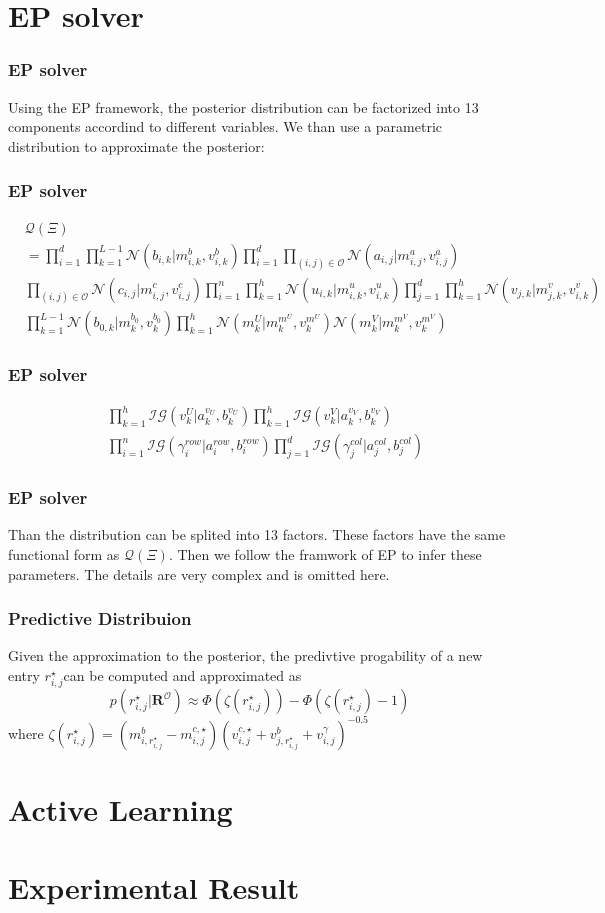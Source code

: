 \documentclass{beamer}
\newcommand{\vect}[1]{\boldsymbol{\mathbf{#1}}} %
\newcommand{\vR}{\vect{R}}
\newcommand{\mN}{\mathcal{N}}
\newcommand{\mO}{\mathcal{O}}
\newcommand{\mQ}{\mathcal{Q}}
\begin{document}
\section{EP solver}
\begin{frame}
    \frametitle{EP solver}
    Using the EP framework, the posterior distribution can be factorized into 13 components accordind to different variables.  We than use a parametric distribution to approximate the posterior:
\end{frame}
\begin{frame}
    \frametitle{EP solver}
    \begin{equation*}
	\begin{split}
	&\mQ(\Xi) \\
	&= \prod_{i=1}^d \prod_{k=1}^{L-1} \mN(b_{i,k}|m_{i,k}^b, v_{i,k}^b)\prod_{i=1}^d \prod_{(i,j)\in \mO} \mN(a_{i,j}|m_{i,j}^a, v_{i,j}^a)\\
	&\prod_{(i,j)\in \mO} \mN(c_{i,j}|m_{i,j}^c, v_{i,j}^c)  \prod_{i=1}^n \prod_{k=1}^{h} \mN(u_{i,k}|m_{i,k}^u, v_{i,k}^u) \prod_{j=1}^d \prod_{k=1}^{h} \mN(v_{j,k}|m_{j,k}^v, v_{i,k}^v)\\
	&\prod^{L-1}_{k=1}\mN(b_{0,k}|m_k^{b_0}, v_k^{b_0})\prod^{h}_{k=1}\mN(m_k^{U}|m_k^{m^U}, v_k^{m^U})\mN(m_k^{V}|m_k^{m^V}, v_k^{m^V})
	\end{split}
    \end{equation*}
\end{frame}
\begin{frame}
    \frametitle{EP solver}
    \begin{equation*}
	\begin{split}
	    & \prod_{k=1}^h \mathcal{IG}(v_k^U|a_k^{v_U}, b_k^{v_U})\prod_{k=1}^h \mathcal{IG}(v_k^V|a_k^{v_V}, b_k^{v_V})\\
	    &\prod_{i=1}^n \mathcal{IG}(\gamma_i^{row}|a_i^{row}, b_i^{row})\prod_{j=1}^d\mathcal{IG}(\gamma_j^{col}|a_j^{col}, b_j^{col})
	\end{split}
    \end{equation*}
\end{frame}
\begin{frame}
    \frametitle{EP solver}
    Than the distribution can be splited into 13 factors. These factors have the same functional form as $\mQ(\Xi)$. Then we follow the framwork of EP to infer these parameters. The details are very complex and is omitted here.
\end{frame}
\begin{frame}
   \frametitle {Predictive Distribuion}
   Given the approximation to the posterior, the predivtive progability of a new entry $r_{i,j}^\star$can be computed and approximated as
   \begin{equation*}
       p(r_{i,j}^\star|\vR^{\mO}) \approx \Phi(\zeta(r^{\star}_{i,j})) - \Phi(\zeta(r_{i,j}^\star)-1)
   \end{equation*}
   where  $\zeta(r_{i,j}^\star) = (m^b_{i,r_{i,j}^\star} - m^{c,\star}_{i,j} )(v_{i,j}^{c,\star}+v^b_{j,r^\star_{i,j}}+v_{i,j}^\gamma)^{-0.5}$
\end{frame}
\section{Active Learning}
\section{Experimental Result}
\end{document}
